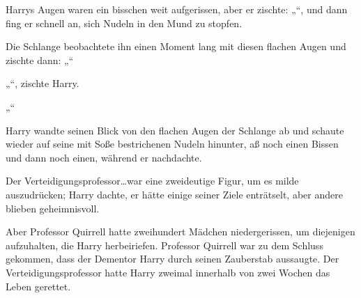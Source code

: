 Harrys Augen waren ein bisschen weit aufgerissen, aber er zischte: „“, und dann fing er schnell an, sich Nudeln in den Mund zu stopfen.

Die Schlange beobachtete ihn einen Moment lang mit diesen flachen Augen und zischte dann: „“

„“, zischte Harry.

„“

Harry wandte seinen Blick von den flachen Augen der Schlange ab und schaute wieder auf seine mit Soße bestrichenen Nudeln hinunter, aß noch einen Bissen und dann noch einen, während er nachdachte.

Der Verteidigungsprofessor…war eine zweideutige Figur, um es milde auszudrücken; Harry dachte, er hätte einige seiner Ziele enträtselt, aber andere blieben geheimnisvoll.

Aber Professor Quirrell hatte zweihundert Mädchen niedergerissen, um diejenigen aufzuhalten, die Harry herbeiriefen. Professor Quirrell war zu dem Schluss gekommen, dass der Dementor Harry durch seinen Zauberstab aussaugte. Der Verteidigungsprofessor hatte Harry zweimal innerhalb von zwei Wochen das Leben gerettet.

